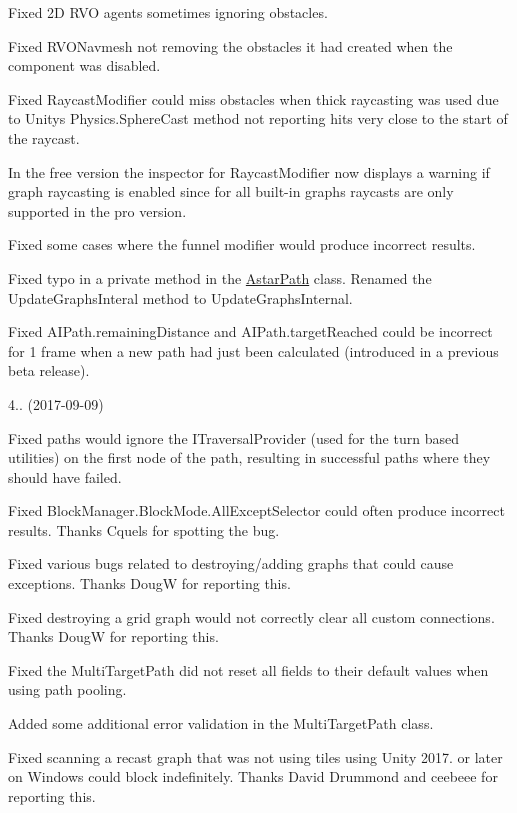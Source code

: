 \begin{DoxyItemize}
\begin{DoxyItemize}
\begin{DoxyItemize}
\item Fixed 2D R\+VO agents sometimes ignoring obstacles.
\item Fixed R\+V\+O\+Navmesh not removing the obstacles it had created when the component was disabled.
\item Fixed Raycast\+Modifier could miss obstacles when thick raycasting was used due to Unity\textquotesingle{}s Physics.\+Sphere\+Cast method not reporting hits very close to the start of the raycast.
\item In the free version the inspector for Raycast\+Modifier now displays a warning if graph raycasting is enabled since for all built-\/in graphs raycasts are only supported in the pro version.
\item Fixed some cases where the funnel modifier would produce incorrect results.
\item Fixed typo in a private method in the \mbox{\hyperlink{class_astar_path}{Astar\+Path}} class. Renamed the Update\+Graphs\+Interal method to Update\+Graphs\+Internal.
\item Fixed A\+I\+Path.\+remaining\+Distance and A\+I\+Path.\+target\+Reached could be incorrect for 1 frame when a new path had just been calculated (introduced in a previous beta release).
\end{DoxyItemize}
\end{DoxyItemize}
\item 4.. (2017-\/09-\/09)
\begin{DoxyItemize}
\item Fixed paths would ignore the I\+Traversal\+Provider (used for the turn based utilities) on the first node of the path, resulting in successful paths where they should have failed.
\item Fixed Block\+Manager.\+Block\+Mode.\+All\+Except\+Selector could often produce incorrect results. Thanks Cquels for spotting the bug.
\item Fixed various bugs related to destroying/adding graphs that could cause exceptions. Thanks DougW for reporting this.
\item Fixed destroying a grid graph would not correctly clear all custom connections. Thanks DougW for reporting this.
\item Fixed the Multi\+Target\+Path did not reset all fields to their default values when using path pooling.
\item Added some additional error validation in the Multi\+Target\+Path class.
\item Fixed scanning a recast graph that was not using tiles using Unity 2017. or later on Windows could block indefinitely. Thanks David Drummond and ceebeee for reporting this.

\end{DoxyItemize}
\end{DoxyItemize}
